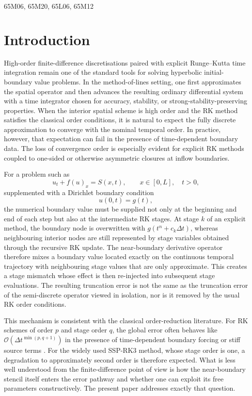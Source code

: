 \documentclass[review,hidelinks,onefignum,onetabnum]{siamart251216}
\newcommand{\Dt}{\Delta t}
\newcommand{\Order}[1]{\mathcal{O}\!\left(#1\right)}
\begin{document}
\begin{MSCcodes}
65M06, 65M20, 65L06, 65M12
\end{MSCcodes}

\section{Introduction}

High-order finite-difference discretisations paired with explicit Runge--Kutta time integration remain one of the standard tools for solving hyperbolic initial-boundary value problems. In the method-of-lines setting, one first approximates the spatial operator and then advances the resulting ordinary differential system with a time integrator chosen for accuracy, stability, or strong-stability-preserving properties. When the interior spatial scheme is high order and the RK method satisfies the classical order conditions, it is natural to expect the fully discrete approximation to converge with the nominal temporal order. In practice, however, that expectation can fail in the presence of time-dependent boundary data. The loss of convergence order is especially evident for explicit RK methods coupled to one-sided or otherwise asymmetric closures at inflow boundaries.

For a problem such as
\begin{equation}
  u_t + f(u)_x = S(x,t), \qquad x\in[0,L], \quad t>0,
  \label{eq:pde}
\end{equation}
supplemented with a Dirichlet boundary condition
\begin{equation}
  u(0,t)=g(t),
  \label{eq:bc}
\end{equation}
the numerical boundary value must be supplied not only at the beginning and end of each step but also at the intermediate RK stages. At stage $k$ of an explicit method, the boundary node is overwritten with $g(t^n+c_k\Dt)$, whereas neighbouring interior nodes are still represented by stage variables obtained through the recursive RK update. The near-boundary derivative operator therefore mixes a boundary value located exactly on the continuous temporal trajectory with neighbouring stage values that are only approximate. This creates a stage mismatch whose effect is then re-injected into subsequent stage evaluations. The resulting truncation error is not the same as the truncation error of the semi-discrete operator viewed in isolation, nor is it removed by the usual RK order conditions.

This mechanism is consistent with the classical order-reduction literature. For RK schemes of order $p$ and stage order $q$, the global error often behaves like $\Order{\Dt^{\min(p,q+1)}}$ in the presence of time-dependent boundary forcing or stiff source terms \cite{Lubich1995,Hundsdorfer2003}. For the widely used SSP-RK3 method, whose stage order is one, a degradation to approximately second order is therefore expected. What is less well understood from the finite-difference point of view is how the near-boundary stencil itself enters the error pathway and whether one can exploit its free parameters constructively. The present paper addresses exactly that question.
\end{document}
